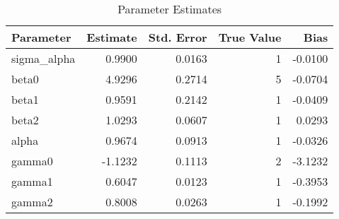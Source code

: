 \begin{table}
\caption{Parameter Estimates}
\begin{tabular}{lrrrr}
\toprule
Parameter & Estimate & Std. Error & True Value & Bias \\
\midrule
sigma_alpha & 0.9900 & 0.0163 & 1 & -0.0100 \\
beta0 & 4.9296 & 0.2714 & 5 & -0.0704 \\
beta1 & 0.9591 & 0.2142 & 1 & -0.0409 \\
beta2 & 1.0293 & 0.0607 & 1 & 0.0293 \\
alpha & 0.9674 & 0.0913 & 1 & -0.0326 \\
gamma0 & -1.1232 & 0.1113 & 2 & -3.1232 \\
gamma1 & 0.6047 & 0.0123 & 1 & -0.3953 \\
gamma2 & 0.8008 & 0.0263 & 1 & -0.1992 \\
\bottomrule
\end{tabular}
\end{table}
